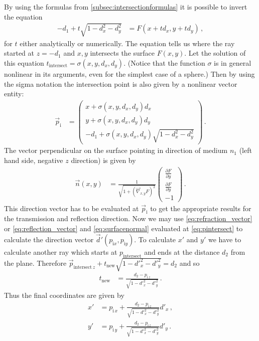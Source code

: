 \documentclass[12pt,a4paper,twoside,openright,BCOR10mm,headsepline,titlepage,abstracton,chapterprefix,final]{scrreprt}
\begin{document}
By using the formulas from \ref{subsec:intersectionformulas} it is possible to invert the equation 
\begin{align}
-d_1 + t \sqrt{1-d_x^2-d_y^2} &= F(x + t d_x, y + t d_y)\,, 
\end{align}
for $t$ either analytically or numerically. The equation tells
us where the ray started at $z = -d_1$ and $x, y$ intersects the surface $F(x, y)$. Let the solution
of this equation $t_\text{intersect} = \sigma(x, y, d_x, d_y)$. (Notice that the function $\sigma$
is in general nonlinear in its arguments, even for the simplest case of a sphere.) Then by using the 
sigma notation the intersection point is also given by a nonlinear vector entity:
\begin{align}
 \vec{p}_\text{i} &= \begin{pmatrix} x + \sigma(x,y,d_x,d_y) d_x \\ y + \sigma(x,y,d_x,d_y) d_y \\ -d_1 + \sigma(x,y,d_x,d_y) \sqrt{1 - d_x^2 - d_y^2} \end{pmatrix}\,.\label{eq:pintersect}
\end{align}
The vector perpendicular on the surface pointing in direction of medium $n_1$ (left hand side, negative $z$ direction) is given
by
\begin{align}
 \vec{n}(x, y) &= 
  \frac{1}{\sqrt{1 + (\vec{\nabla}_{x,y} F)^2}} 
  \begin{pmatrix} \frac{\partial F}{\partial y} \\ \frac{\partial F}{\partial y} \\ -1 \end{pmatrix}\,.\label{eq:surfacenormal}
\end{align}
This direction vector has to be evaluated at $\vec{p}_\text{i}$ to get the appropriate results for
the transmission and reflection direction. Now we may use \eqref{eq:refraction_vector} or \eqref{eq:reflection_vector}
and \eqref{eq:surfacenormal} evaluated at \eqref{eq:pintersect} to calculate the direction vector $\vec{d}'(p_{\text{i} x}, p_{\text{i} y})$.
To calculate $x'$ and $y'$ we have to calculate another ray which starts at $p_\text{intersect}$ and ends at the
distance $d_2$ from the plane. Therefore $\vec{p}_{\text{intersect}\,z} + t_\text{new} \sqrt{1 - {d'}_x^2 - {d'}_y^2} = d_2$ and so
\begin{align}
t_\text{new} &= \frac{d_2 - p_{\text{i}\,z}}{\sqrt{1 - {d'}_x^2 - {d'}_y^2}}\,.
\end{align}
Thus the final coordinates are given by
\begin{subequations}
\begin{align}
 x' &= p_{\text{i}\,x} + \frac{d_2 - p_{\text{i}\,z}}{\sqrt{1 - {d'}_x^2 - {d'}_y^2}} {d'}_x\,,\\
 y' &= p_{\text{i}\,y} + \frac{d_2 - p_{\text{i}\,z}}{\sqrt{1 - {d'}_x^2 - {d'}_y^2}} {d'}_y\,.
\end{align}
\end{subequations}
\end{document}

